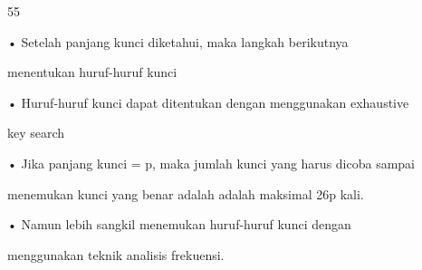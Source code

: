 \documentclass{article}
\begin{document}

55

• Setelah panjang kunci diketahui, maka langkah berikutnya 

menentukan huruf-huruf kunci

• Huruf-huruf kunci dapat ditentukan dengan  menggunakan exhaustive 

key search

• Jika panjang kunci = p, maka jumlah kunci yang harus dicoba sampai 

menemukan kunci yang benar adalah adalah maksimal 26p kali.

• Namun lebih sangkil menemukan huruf-huruf kunci dengan 

menggunakan teknik analisis frekuensi.
\end{document}

